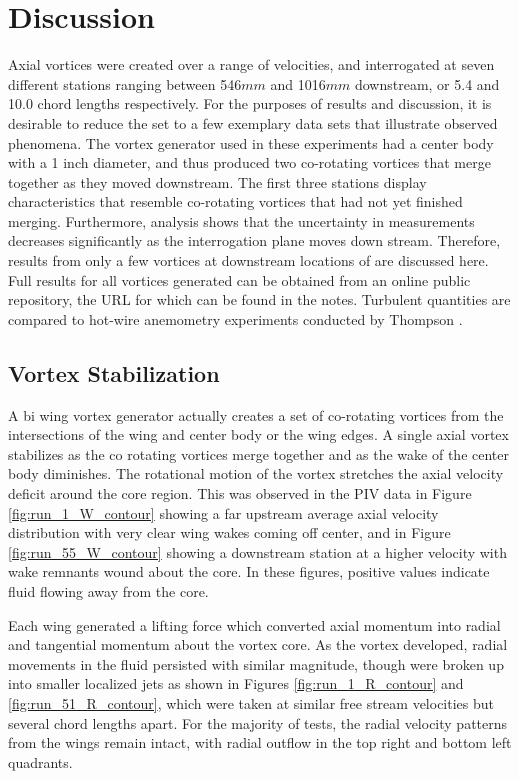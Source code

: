 
\section{Discussion}

Axial vortices were created over a range of velocities, and interrogated at 
seven different stations ranging between 546$mm$ and 1016$mm$ downstream, or 
5.4 and 10.0 chord lengths respectively. For the 
purposes of results and discussion, it is desirable to reduce the set to a few 
exemplary data sets that illustrate observed phenomena. The vortex generator 
used in these experiments had a center body with a 1 inch diameter, and thus 
produced two co-rotating vortices that merge together as they moved downstream. 
The first three stations display characteristics that resemble co-rotating 
vortices that had not yet finished merging. Furthermore, analysis shows that 
the uncertainty in measurements decreases significantly as the interrogation 
plane moves down stream. Therefore, results from only a few vortices at 
downstream locations of are discussed here. Full results for all vortices 
generated can be obtained from an online public repository, the URL for which 
can be found in the notes. Turbulent quantities are compared to hot-wire 
anemometry experiments conducted by Thompson \cite{thompson2016}.


\subsection{Vortex Stabilization}
A bi wing vortex generator actually creates a set of co-rotating vortices from 
the intersections of the wing and center body or the wing edges. A single axial 
vortex stabilizes as the co rotating vortices merge together and as the 
wake of the center body diminishes. The rotational motion of the vortex 
stretches the axial velocity deficit around the core region. This was observed 
in the PIV data in Figure \ref{fig:run_1_W_contour} showing a far upstream 
average axial velocity distribution with very clear wing wakes coming off 
center, and in Figure \ref{fig:run_55_W_contour} showing a downstream station 
at a higher velocity with wake remnants wound about the core. In these figures, 
positive values indicate fluid flowing away from the core.




Each wing generated a lifting force which converted axial momentum into radial 
and tangential momentum about the vortex core. As the vortex developed, radial 
movements in the fluid persisted with similar magnitude, though were broken up 
into smaller localized jets as shown in Figures \ref{fig:run_1_R_contour} and 
\ref{fig:run_51_R_contour}, which were taken at similar free stream velocities 
but several chord lengths apart. For the majority of tests, the radial velocity 
patterns from the wings remain intact, with radial outflow in the top right and 
bottom left quadrants. 

